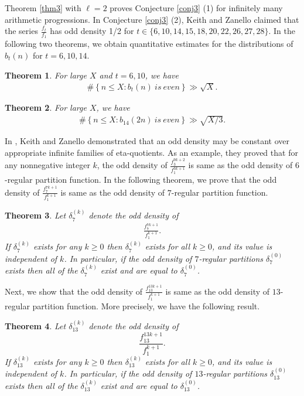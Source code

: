 \documentclass[reqno]{amsart}
\newtheorem{theorem}{Theorem}[section]
\theoremstyle{definition}
\theoremstyle{remark}
\numberwithin{equation}{section}
\begin{document}
Theorem \ref{thm3} with $\ell=2$ proves Conjecture \ref{conj3} (1) for infinitely many arithmetic progressions.
In Conjecture \ref{conj3} (2), Keith and Zanello claimed that the series $\frac{f_t}{f_1}$ has odd density 1/2 for $t\in \{6,10,14,15,18,20,22,26,27,28\}$. 
In the following two theorems, we obtain quantitative estimates for the distributions of $b_t(n)$ for $t=6,10,14$.
\begin{theorem}\label{thm4}
For large $X$ and $t=6, 10$, we have
\begin{align}\label{b6bound1}
\#\left\lbrace n\leq X : b_{t}\left( n\right)\ is\ even \right\rbrace \gg \sqrt{X}.
\end{align}
\end{theorem}
\begin{theorem}\label{thm4a}
For large $X$, we have
\begin{align*}
\#\left\lbrace n\leq X: b_{14}\left( 2n\right)\ is\ even \right\rbrace \gg \sqrt{X/3}.
\end{align*}
\end{theorem}
In \cite{Keith2021}, Keith and Zanello demonstrated that an odd density may be constant over appropriate infinite families of eta-quotients. 
As an example, they proved that for any nonnegative integer $k$, the odd density of $\frac{f^{9k+2}_{3}}{f^{3k+1}_{1}}$ is same as the odd density of $6$-regular partition function. 
In the following theorem, we prove that the odd density of $\frac{f^{7k+1}_{7}}{f^{k+1}_{1}}$ is same as the odd density of $7$-regular partition function.
\begin{theorem}\label{thm7}
Let $\delta^{\left( k\right)}_7$ denote the odd density of 
\begin{align*}
\frac{f^{7k+1}_{7}}{f^{k+1}_{1}}.
\end{align*}
If $\delta^{\left( k\right)}_7$ exists for any $k\geq 0$ then $\delta^{(k)}_7$ exists for all $k\geq 0$, and its value is independent of $k$. 
In particular, if the odd density of $7$-regular partitions $\delta^{(0)}_{7}$ exists then all of the $\delta^{\left( k\right)}_7$ exist and are equal to $\delta^{(0)}_{7}$.
\end{theorem}
Next, we show that the odd density of $\frac{f^{13k+1}_{13}}{f^{k+1}_{1}}$ is same as the odd density of $13$-regular partition function. More precisely, we have the following result.
\begin{theorem}\label{thm8}
Let $\delta^{\left( k\right)}_{13}$ denote the odd density of 
\begin{equation*}
\frac{f^{13k+1}_{13}}{f^{k+1}_{1}}.
\end{equation*}
If $\delta^{\left( k\right)}_{13}$ exists for any $k\geq 0$ then $\delta^{\left( k\right)}_{13}$ exists for all $k\geq 0$, and its value is independent of $k$. 
In particular, if the odd density of $13$-regular partitions $\delta^{(0)}_{13}$ exists then all of the $\delta^{(k)}_{13}$ exist and are equal to $\delta^{(0)}_{13}$.
\end{theorem}
\end{document}
